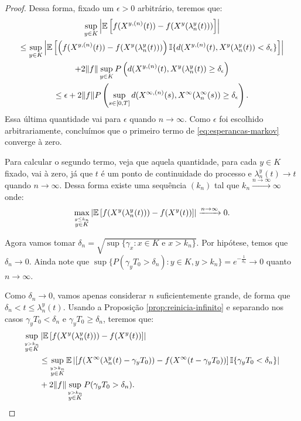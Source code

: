 \begin{proof}
  Dessa forma, fixado um $\epsilon > 0$ arbitrário, teremos que:
  \begin{gather*}
    \sup_{y\in K} \left\lvert {\mathbb{E}} \left[ f(X^{y,(n)}(t)) -
        f(X^{y}(\lambda_n^y(t))) \right]
    \right\rvert\\
    \leq \sup_{y\in K} \left\lvert {\mathbb{E}} \left[ \left(f(X^{y,(n)}(t)) -
          f(X^{y}(\lambda_n^y(t))) \right) {\mathbb{I}}\{ d(X^{y, (n)}(t),
        X^y(\lambda_n^y(t)) < \delta_\epsilon \} \right]
    \right\rvert \\
    + 2\Vert f \Vert \sup_{y \in K} P\left( d(X^{y, (n)}(t),
      X^y(\lambda_n^y(t)) \geq
      \delta_\epsilon \right) \\
    \leq \epsilon + 2 \Vert f \Vert P \left( \sup_{s \in [0,
        T]}d(X^{\infty, (n)}(s), X^\infty(\lambda_n^\infty(s)) \geq
      \delta_\epsilon \right).
  \end{gather*}
  Essa última quantidade vai para $\epsilon$ quando $n\to
  \infty$. Como $\epsilon$ foi escolhido arbitrariamente, concluímos
  que o primeiro termo de \eqref{eq:esperancas-markov} converge à
  zero.

  Para calcular o segundo termo, veja que aquela quantidade, para cada
  $y \in K$ fixado, vai à zero, já que $t$ é \qc um ponto de
  continuidade do processo e $\lambda_n^y(t) \to t$ quando
  $n\to\infty$. Dessa forma existe uma sequência $(k_n)$ tal que $k_n
  \xrightarrow{n\to\infty} \infty$ onde:
  \begin{displaymath}
      \max_{\stackrel{y \leq k_n}{y\in K}} \left\lvert
      {\mathbb{E}} \left[f(X^y(\lambda_n^y(t))) - f(X^y(t)) \right]
    \right\rvert \xrightarrow{n\to \infty} 0.
  \end{displaymath}

  Agora vamos tomar $\delta_n = \sqrt{\sup\{ \gamma_x: x \in K
    \textrm{ e } x > k_n\}}$. Por hipótese, temos que $\delta_n \to
  0$. Ainda note que $\sup \{ P(\gamma_y T_0 > \delta_n) : y \in K, y
  > k_n \} = e^{-\frac{1}{\delta_n}} \to 0$ quanto $n \to \infty$.

  Como $\delta_n \to 0$, vamos apenas considerar $n$ suficientemente
  grande, de forma que $\delta_n < t \leq \lambda_n^y(t)$. Usando a
  Proposição \ref{prop:reinicia-infinito} e separando nos casos
  $\gamma_yT_0 < \delta_n$ e $\gamma_yT_0 \geq \delta_n$, teremos que:
  \begin{align}
    \label{eq:markov-quase-la}
    \sup_{\stackrel{y > k_n}{y \in K}}& \left\lvert {\mathbb{E}} \left[f(X^y(\lambda_n^y(t))) -
        f(X^y(t)) \right]
    \right\rvert \notag \\
    &\leq \sup_{\stackrel{y > k_n}{y \in K}} {\mathbb{E}} \left\lvert
      \left[f(X^\infty(\lambda_n^y(t)-\gamma_yT_0)) -
        f(X^\infty(t-\gamma_yT_0)) \right] {\mathbb{I}}\{ \gamma_yT_0 <
      \delta_n \}
    \right\rvert\\
    &+ 2 \Vert f \Vert \sup_{\stackrel{y > k_n}{y \in K}} P(\gamma_y T_0 > \delta_n).
    \notag
  \end{align}


\end{proof}
